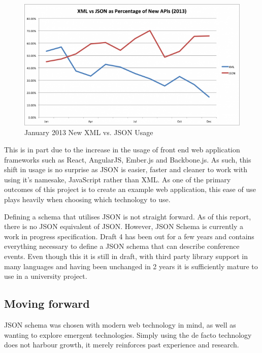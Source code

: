 \documentclass{article}
\begin{document}
\begin{figure}[h]
  \centering
  \includegraphics[scale=0.37]{images/xml_json_jan_2013.png}
  \caption{January 2013 New XML vs. JSON Usage\protect\cite{duvander2013json}}
  \label{fig:JSON_XML_jan_2013}
\end{figure}

This is in part due to the increase in the usage of front end web application frameworks such as React, AngularJS, Ember.js and Backbone.js. As such, this shift in usage is no surprise as JSON is easier, faster and cleaner \cite{hellstrom2012querying,lin2012comparison,nurseitov2009comparison} to work with using it's namesake, JavaScript rather than XML. As one of the primary outcomes of this project is to create an example web application, this ease of use plays heavily when choosing which technology to use.

Defining a schema that utilises JSON is not straight forward. As of this report, there is no JSON equivalent of JSON. However, JSON Schema \cite{galiegue2013json} is currently a work in progress specification. Draft 4 has been out for a few years and contains everything necessary to define a JSON schema that can describe conference events. Even though this it is still in draft, with third party library support in many languages \cite{galiegue2013inplementations} and having been unchanged in 2 years it is sufficiently mature to use in a university project.

\subsection{Moving forward}
JSON schema was chosen with modern web technology in mind, as well as wanting to explore emergent technologies. Simply using the de facto technology does not harbour growth, it merely reinforces past experience and research.
\end{document}

